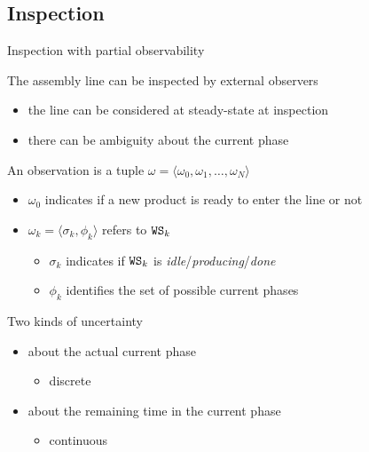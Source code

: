   \subsection{Inspection}
    \begin{frame}{Inspection with partial observability}
      
      The assembly line can be inspected by external observers
      \begin{itemize}
        \item the line can be considered at steady-state at inspection
        \item there can be ambiguity about the current phase
      \end{itemize}
      
      \vspace{1em}
      An observation is a tuple $\omega=\langle \omega_0, \omega_1,\ldots, \omega_N \rangle$
      \begin{itemize}
        \item $\omega_0$ indicates if a new product is ready to enter the line or not
        \item $\omega_k = \langle \sigma_k, \phi_k \rangle$ refers to $\mathtt{WS}_k$
        \begin{itemize}
          \item $\sigma_k$ indicates if $\mathtt{WS}_k$ is \textit{idle}/\textit{producing}/\textit{done}
          \item $\phi_k$ identifies the set of possible current phases
        \end{itemize}
      \end{itemize}
        
      \vspace{1em}
      \begin{minipage}{0.65\textwidth}
        Two kinds of uncertainty
        \begin{itemize}
          \item about the actual current phase
          \begin{itemize}
            \item discrete
          \end{itemize}
          \item about the remaining time in the current phase%
          \begin{itemize}
            \item continuous
          \end{itemize}
        \end{itemize}
      \end{minipage}
      \begin{minipage}{0.3\textwidth}
        \begin{center}\scalebox{0.65}{}\end{center}
      \end{minipage}
    \end{frame}
  
